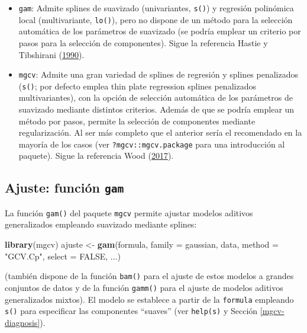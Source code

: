 \documentclass[
  spanish,
]{book}
\newenvironment{Shaded}{\begin{snugshade}}{\end{snugshade}}
\newcommand{\DataTypeTok}[1]{\textcolor[rgb]{0.13,0.29,0.53}{#1}}
\newcommand{\KeywordTok}[1]{\textcolor[rgb]{0.13,0.29,0.53}{\textbf{#1}}}
\newcommand{\NormalTok}[1]{#1}
\newcommand{\OtherTok}[1]{\textcolor[rgb]{0.56,0.35,0.01}{#1}}
\newcommand{\StringTok}[1]{\textcolor[rgb]{0.31,0.60,0.02}{#1}}
\theoremstyle{break}
\theoremstyle{definition}
\theoremstyle{definition}
\theoremstyle{definition}
\theoremstyle{remark}
\begin{document}
\begin{itemize}
\item
  \texttt{gam}: Admite splines de suavizado (univariantes, \texttt{s()}) y regresión polinómica local (multivariante, \texttt{lo()}), pero no dispone de un método para la selección automática de los parámetros de suavizado (se podría emplear un criterio por pasos para la selección de componentes).
  Sigue la referencia Hastie y Tibshirani (\protect\hyperlink{ref-hastie1990generalized}{1990}).
\item
  \texttt{mgcv}: Admite una gran variedad de splines de regresión y splines penalizados (\texttt{s()}; por defecto emplea thin plate regression splines penalizados multivariantes), con la opción de selección automática de los parámetros de suavizado mediante distintos criterios.
  Además de que se podría emplear un método por pasos, permite la selección de componentes mediante regularización.
  Al ser más completo que el anterior sería el recomendado en la mayoría de los casos (ver \texttt{?mgcv::mgcv.package} para una introducción al paquete).
  Sigue la referencia Wood (\protect\hyperlink{ref-wood2017generalized}{2017}).
\end{itemize}

\hypertarget{ajuste-funciuxf3n-gam}{%
\subsection{\texorpdfstring{Ajuste: función \texttt{gam}}{Ajuste: función gam}}\label{ajuste-funciuxf3n-gam}}

La función \texttt{gam()} del paquete \texttt{mgcv} permite ajustar modelos aditivos generalizados empleando suavizado mediante splines:

\begin{Shaded}
\begin{Highlighting}[]
\KeywordTok{library}\NormalTok{(mgcv)}
\NormalTok{ajuste <-}\StringTok{ }\KeywordTok{gam}\NormalTok{(formula, }\DataTypeTok{family =}\NormalTok{ gaussian, data, }\DataTypeTok{method =} \StringTok{"GCV.Cp"}\NormalTok{, }\DataTypeTok{select =} \OtherTok{FALSE}\NormalTok{, ...)}
\end{Highlighting}
\end{Shaded}

(también dispone de la función \texttt{bam()} para el ajuste de estos modelos a grandes conjuntos de datos y de la función \texttt{gamm()} para el ajuste de modelos aditivos generalizados mixtos). El modelo se establece a partir de la \texttt{formula} empleando \texttt{s()} para especificar las componentes ``suaves'' (ver \texttt{help(s)} y Sección \ref{mgcv-diagnosis}).
\end{document}
